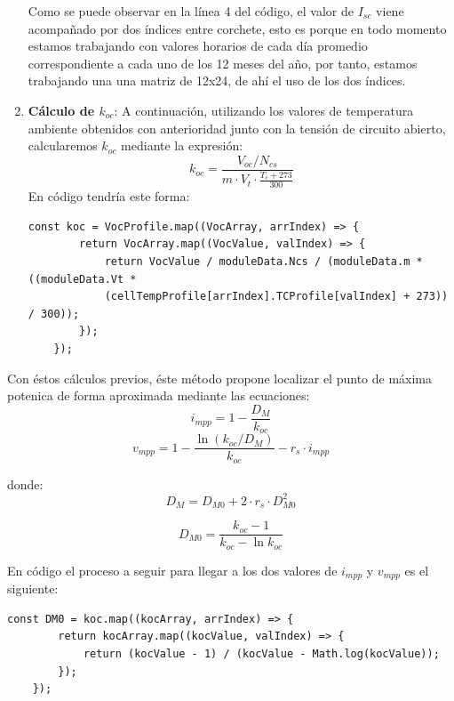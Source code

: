 \begin{enumerate}
Como se puede observar en la línea 4 del código, el valor de $I_{sc}$ viene acompañado por dos índices entre corchete, esto es porque en todo momento estamos trabajando con valores horarios de cada día promedio correspondiente a cada uno de los 12 meses del año, por tanto, estamos trabajando una una matriz de 12x24, de ahí el uso de los dos índices. 

\item \textbf{Cálculo de $k_{oc}$}: A continuación, utilizando los valores de temperatura ambiente obtenidos con anterioridad junto con la tensión de circuito abierto, calcularemos $k_{oc}$ mediante la expresión:
\begin{equation}
k_{oc} = \frac{V_{oc} / N_{cs}}{m \cdot V_t \cdot \frac{T_c + 273}{300}}
\end{equation}
En código tendría este forma:
\begin{lstlisting}[style=ES6, caption={Cálculo de $k_{oc}$}]
	const koc = VocProfile.map((VocArray, arrIndex) => {
		return VocArray.map((VocValue, valIndex) => {
			return VocValue / moduleData.Ncs / (moduleData.m * ((moduleData.Vt *
			(cellTempProfile[arrIndex].TCProfile[valIndex] + 273)) / 300));
		});
	});
\end{lstlisting} 
\end{enumerate}

Con éstos cálculos previos, éste método propone localizar el punto de máxima potenica de forma aproximada mediante las ecuaciones:
\begin{equation}
i_{mpp} = 1 - \frac{D_M}{k_{oc}}
\end{equation}
\begin{equation}
v_{mpp} = 1 - \frac{\ln(k_{oc}/D_M)}{k_{oc}}-r_s\cdot i_{mpp}
\end{equation}

donde:
\begin{equation}
D_M = D_{M0} + 2 \cdot r_s \cdot D_{M0}^2
\end{equation}

\begin{equation}
D_{M0} = \frac{k_{oc}-1}{k_{oc} - \ln k_{oc}}
\end{equation}

En código el proceso a seguir para llegar a los dos valores de $i_{mpp}$ y $v_{mpp}$ es el siguiente:

\begin{lstlisting}[style=ES6, caption={Cálculo de $D_{M0}$}]
	const DM0 = koc.map((kocArray, arrIndex) => {
		return kocArray.map((kocValue, valIndex) => {
			return (kocValue - 1) / (kocValue - Math.log(kocValue));
		});
	});
\end{lstlisting} 


